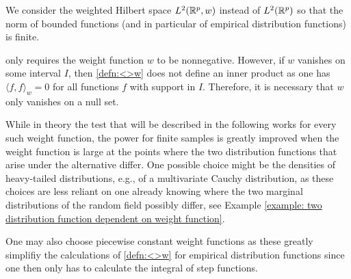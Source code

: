 

\begin{remark} \label{remark:weight function w}
    \begin{aufzi}
        \item We consider the weighted Hilbert space $L^2(\mathbb{R}^p, w)$ instead of $L^2(\mathbb{R}^p)$ so that the norm of bounded functions (and in particular of empirical distribution functions) is finite.
        \item \cite{[0]BUCCHIA2017344} only requires the weight function $w$ to be nonnegative. However, if $w$ vanishes on some interval $I$, then \ref{defn:<>w} does not define an inner product as one has $\langle f, f \rangle_w = 0$ for all functions $f$ with support in $I$. Therefore, it is necessary that $w$ only vanishes on a null set.
        \item While in theory the test that will be described in the following works for every such weight function, the power for finite samples is greatly improved when the weight function is large at the points where the two distribution functions that arise under the alternative differ. One possible choice might be the densities of heavy-tailed distributions, e.g., of a multivariate Cauchy distribution, as these choices are less reliant on one already knowing where the two marginal distributions of the random field possibly differ, see Example \ref{example: two distribution function dependent on weight function}.
        
        One may also choose piecewise constant weight functions as these greatly simplifiy the calculations of \ref{defn:<>w} for empirical distribution functions since one then only has to calculate the integral of step functions.
    \end{aufzi}
\end{remark}

